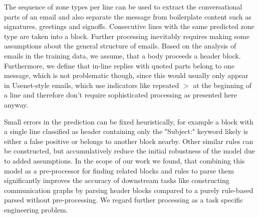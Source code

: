 \documentclass{llncs}
\begin{document}
The sequence of zone types per line can be used to extract the conversational parts of an email and also separate the message from boilerplate content such as signatures, greetings and signoffs.
Consecutive lines with the same predicted zone type are taken into a block.
Further processing inevitably requires making some assumptions about the general structure of emails.
Based on the analysis of emails in the training data, we assume, that a body proceeds a header block.
Furthermore, we define that in-line replies with quoted parts belong to one message, which is not problematic though, since this would usually only appear in Usenet-style emails, which use indicators like repeated $>$ at the beginning of a line and therefore don't require sophisticated processing as presented here anyway.

Small errors in the prediction can be fixed heuristically, for example a block with a single line classified as header containing only the "Subject:" keyword likely is either a false positive or belongs to another block nearby.
Other similar rules can be constructed, but accumulatively reduce the initial robustness of the model due to added assumptions.
In the scope of our work we found, that combining this model as a pre-processor for finding related blocks and rules to parse them significantly improves the accuracy of downstream tasks like constructing communication graphs by parsing header blocks compared to a purely rule-based parsed without pre-processing.
We regard further processing as a task specific engineering problem.


\end{document}
